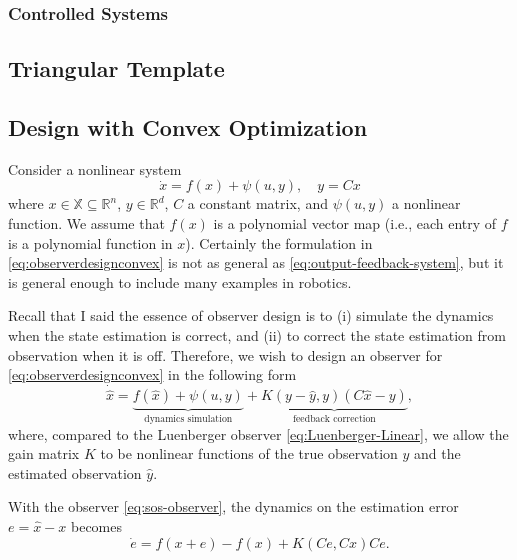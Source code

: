 \documentclass[
]{book}
\theoremstyle{definition}
\theoremstyle{definition}
\theoremstyle{definition}
\theoremstyle{definition}
\theoremstyle{remark}
\begin{document}
\hypertarget{controlled-systems-1}{%
\subsubsection{Controlled Systems}\label{controlled-systems-1}}

\hypertarget{triangular-template}{%
\subsection{Triangular Template}\label{triangular-template}}

\hypertarget{design-with-convex-optimization}{%
\subsection{Design with Convex Optimization}\label{design-with-convex-optimization}}

Consider a nonlinear system
\begin{equation}
\dot{x} = f(x) + \psi(u,y), \quad y = Cx
\label{eq:observerdesignconvex}
\end{equation}
where \(x \in \mathbb{X} \subseteq \mathbb{R}^n\), \(y \in \mathbb{R}^d\), \(C\) a constant matrix, and \(\psi(u,y)\) a nonlinear function. We assume that \(f(x)\) is a polynomial vector map (i.e., each entry of \(f\) is a polynomial function in \(x\)). Certainly the formulation in \eqref{eq:observerdesignconvex} is not as general as \eqref{eq:output-feedback-system}, but it is general enough to include many examples in robotics.

Recall that I said the essence of observer design is to (i) simulate the dynamics when the state estimation is correct, and (ii) to correct the state estimation from observation when it is off. Therefore, we wish to design an observer for \eqref{eq:observerdesignconvex} in the following form
\begin{equation}
\dot{\hat{x}} = \underbrace{f(\hat{x}) + \psi(u,y)}_{\text{dynamics simulation}} + \underbrace{K(y - \hat{y},y)(C \hat{x} - y)}_{\text{feedback correction}},
\label{eq:sos-observer}
\end{equation}
where, compared to the Luenberger observer \eqref{eq:Luenberger-Linear}, we allow the gain matrix \(K\) to be nonlinear functions of the true observation \(y\) and the estimated observation \(\hat{y}\).

With the observer \eqref{eq:sos-observer}, the dynamics on the estimation error \(e = \hat{x} - x\) becomes
\[
\dot{e} = f(x + e) - f(x) + K(Ce,Cx)C e.
\]
\end{document}
